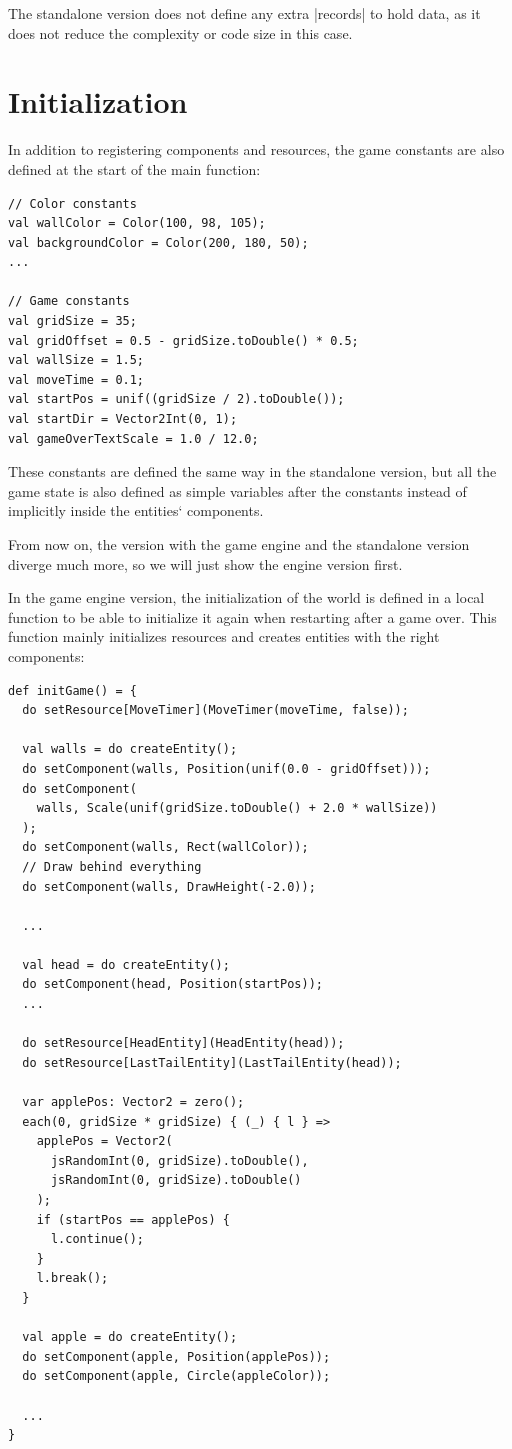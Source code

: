 The standalone version does not define any extra |records| to hold data, as it does not reduce the complexity or code size in this case.

\section{Initialization}

In addition to registering components and resources, the game constants are also defined at the start of the main function:

\begin{lstlisting}
// Color constants
val wallColor = Color(100, 98, 105);
val backgroundColor = Color(200, 180, 50);
...

// Game constants
val gridSize = 35;
val gridOffset = 0.5 - gridSize.toDouble() * 0.5;
val wallSize = 1.5;
val moveTime = 0.1;
val startPos = unif((gridSize / 2).toDouble());
val startDir = Vector2Int(0, 1);
val gameOverTextScale = 1.0 / 12.0;
\end{lstlisting}

These constants are defined the same way in the standalone version, but all the game state is also defined as simple variables after the constants instead of implicitly inside the entities` components.

From now on, the version with the game engine and the standalone version diverge much more, so we will just show the engine version first.

In the game engine version, the initialization of the world is defined in a local function to be able to initialize it again when restarting after a game over. This function mainly initializes resources and creates entities with the right components:

\begin{lstlisting}
def initGame() = {
  do setResource[MoveTimer](MoveTimer(moveTime, false));

  val walls = do createEntity();
  do setComponent(walls, Position(unif(0.0 - gridOffset)));
  do setComponent(
	walls, Scale(unif(gridSize.toDouble() + 2.0 * wallSize))
  );
  do setComponent(walls, Rect(wallColor));
  // Draw behind everything
  do setComponent(walls, DrawHeight(-2.0));

  ...

  val head = do createEntity();
  do setComponent(head, Position(startPos));
  ...

  do setResource[HeadEntity](HeadEntity(head));
  do setResource[LastTailEntity](LastTailEntity(head));

  var applePos: Vector2 = zero();
  each(0, gridSize * gridSize) { (_) { l } =>
    applePos = Vector2(
	  jsRandomInt(0, gridSize).toDouble(),
	  jsRandomInt(0, gridSize).toDouble()
	);
    if (startPos == applePos) {
      l.continue();
    }
    l.break();
  }

  val apple = do createEntity();
  do setComponent(apple, Position(applePos));
  do setComponent(apple, Circle(appleColor));

  ...
}
\end{lstlisting}

